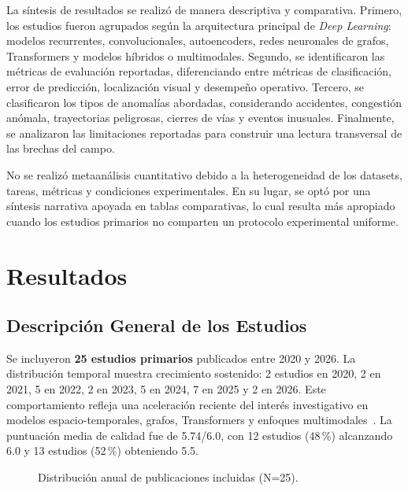 \documentclass[12pt, a4paper]{article}
\begin{document}
La s\'{i}ntesis de resultados se realiz\'{o} de manera descriptiva y comparativa. Primero, los estudios fueron agrupados seg\'{u}n la arquitectura principal de \textit{Deep Learning}: modelos recurrentes, convolucionales, autoencoders, redes neuronales de grafos, Transformers y modelos h\'{i}bridos o multimodales. Segundo, se identificaron las m\'{e}tricas de evaluaci\'{o}n reportadas, diferenciando entre m\'{e}tricas de clasificaci\'{o}n, error de predicci\'{o}n, localizaci\'{o}n visual y desempe\~{n}o operativo. Tercero, se clasificaron los tipos de anomal\'{i}as abordadas, considerando accidentes, congesti\'{o}n an\'{o}mala, trayectorias peligrosas, cierres de v\'{i}as y eventos inusuales. Finalmente, se analizaron las limitaciones reportadas para construir una lectura transversal de las brechas del campo.

No se realiz\'{o} metaan\'{a}lisis cuantitativo debido a la heterogeneidad de los datasets, tareas, m\'{e}tricas y condiciones experimentales. En su lugar, se opt\'{o} por una s\'{i}ntesis narrativa apoyada en tablas comparativas, lo cual resulta m\'{a}s apropiado cuando los estudios primarios no comparten un protocolo experimental uniforme.

\section{Resultados}
\label{sec:resultados}

\subsection{Descripci\'{o}n General de los Estudios}

Se incluyeron \textbf{25 estudios primarios} publicados entre 2020 y 2026. La distribuci\'{o}n temporal muestra crecimiento sostenido: 2 estudios en 2020, 2 en 2021, 5 en 2022, 2 en 2023, 5 en 2024, 7 en 2025 y 2 en 2026. Este comportamiento refleja una aceleraci\'{o}n reciente del inter\'{e}s investigativo en modelos espacio-temporales, grafos, Transformers y enfoques multimodales~\cite{park2025graph,duan2025multimodal}. La puntuaci\'{o}n media de calidad fue de 5.74/6.0, con 12 estudios (48\,\%) alcanzando 6.0 y 13 estudios (52\,\%) obteniendo 5.5.

\begin{figure}[H]
\centering
{}
\caption{Distribuci\'{o}n anual de publicaciones incluidas (N=25).}
\label{fig:publicaciones_anuales}
\end{figure}
\end{document}
